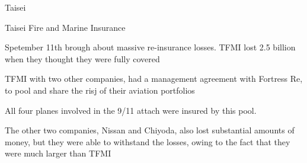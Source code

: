 Taisei

Taisei Fire and Marine Insurance

Spetember 11th brough about massive re-insurance losses.
TFMI lost 2.5 billion when they thought they were fully covered

TFMI with two other companies, had a management agreement with Fortress Re, to pool
 and share the risj of their aviation portfolios

All four planes involved in the 9/11 attach were insured by this pool.

The other two companies, Nissan and Chiyoda, also lost substantial amounts of money, but
they were able to withstand the losses, owing to the fact that they were much larger than TFMI

